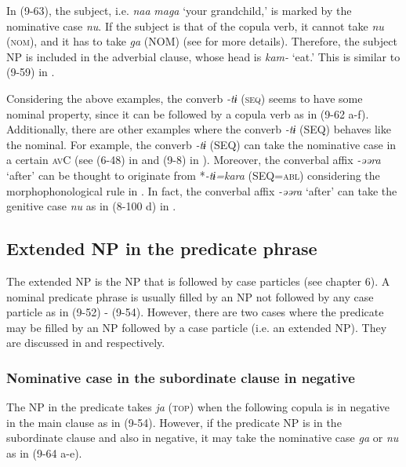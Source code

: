 In (9-63), the subject, i.e. \textit{naa} \textit{maga} ‘your grandchild,’ is marked by the nominative case \textit{nu}. If the subject is that of the copula verb, it cannot take \textit{nu} (\textsc{nom}), and it has to take \textit{ga} (NOM) (see  for more details). Therefore, the subject NP is included in the adverbial clause, whose head is \textit{kam-} ‘eat.’ This is similar to (9-59) in .

Considering the above examples, the converb \textit{{}-tɨ} (\textsc{seq}) seems to have some nominal property, since it can be followed by a copula verb as in (9-62 a-f). Additionally, there are other examples where the converb \textit{{}-tɨ} (SEQ) behaves like the nominal. For example, the converb \textit{{}-tɨ} (SEQ) can take the nominative case in a certain \textsc{av}C (see (6-48) in  and (9-8) in ). Moreover, the converbal affix \textit{{}-əəra} ‘after’ can be thought to originate from *\textit{{}-tɨ=kara} (SEQ=\textsc{abl}) considering the morphophonological rule in . In fact, the converbal affix \textit{{}-əəra} ‘after’ can take the genitive case \textit{nu} as in (8-100 d) in .

\subsection{Extended NP in the predicate phrase}\label{sec:9.3.3}

The extended NP is the NP that is followed by case particles (see chapter 6). A nominal predicate phrase is usually filled by an NP not followed by any case particle as in (9-52) - (9-54). However, there are two cases where the predicate may be filled by an NP followed by a case particle (i.e. an extended NP). They are discussed in  and  respectively.

\subsubsection{Nominative case in the subordinate clause in negative}\label{sec:9.3.3.1}

The NP in the predicate takes \textit{ja} (\textsc{top}) when the following copula is in negative in the main clause as in (9-54). However, if the predicate NP is in the subordinate clause and also in negative, it may take the nominative case \textit{ga} or \textit{nu} as in (9-64 a-e).

